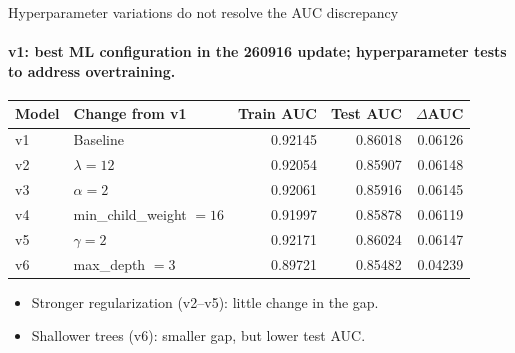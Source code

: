 \begin{frame}[label=p4_20260920]{Hyperparameter variations do not resolve the AUC discrepancy}
\framesubtitle{v1: best ML configuration in the 260916 update; hyperparameter tests to address overtraining.}

\begin{center}\small\renewcommand{\arraystretch}{1.0}
\begin{tabular}{@{}llrrr@{}}\toprule
Model & Change from v1 & Train AUC & Test AUC & $\Delta$AUC\\\midrule
v1 & Baseline & 0.92145 & 0.86018 & 0.06126\\
v2 & $\lambda=12$ & 0.92054 & 0.85907 & 0.06148\\
v3 & $\alpha=2$ & 0.92061 & 0.85916 & 0.06145\\
v4 & min\_child\_weight $=16$ & 0.91997 & 0.85878 & 0.06119\\
v5 & $\gamma=2$ & 0.92171 & 0.86024 & 0.06147\\
v6 & max\_depth $=3$ & 0.89721 & 0.85482 & 0.04239\\
\bottomrule\end{tabular}\end{center}
\par\vspace{0.2em}
\begin{itemize}\item Stronger regularization (v2--v5): little change in the gap.\item Shallower trees (v6): smaller gap, but lower test AUC.\end{itemize}

\end{frame}

